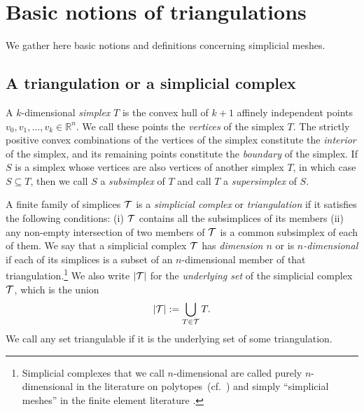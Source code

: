 \documentclass[10pt,a4paper]{article}
\newcommand\cye[1]{%
\protect\leavevmode
\begingroup
    \color{blue}%
    #1%
\endgroup
}
\begin{document}
\section{Basic notions of triangulations}\label{section:triangulations}

We gather here basic notions and definitions concerning simplicial meshes. 
  
\subsection{A triangulation or a simplicial complex}

A ${k}$-dimensional \emph{simplex} $T$ is the convex hull of ${k}+1$ affinely independent points $v_0, v_1, \ldots, v_{{k}} \in \mathbb{R}^{n}$. We call these points the \emph{vertices} of the simplex $T$. 
The strictly positive convex combinations of the vertices of the simplex constitute the \textit{ interior} of the simplex,
and its remaining points constitute the \textit{boundary} of the simplex.
If $S$ is a simplex whose vertices are also vertices of another simplex $T$, in which case $S \subseteq T$, 
then we call $S$ a \textit{subsimplex} of $T$ and call $T$ a \textit{supersimplex} of $S$. 


A finite family of simplices ${\mathcal T}$ is a \emph{simplicial complex} or \emph{triangulation} if it satisfies the following conditions: 
(i) ${\mathcal T}$ contains all the subsimplices of its members (ii) any non-empty intersection of two members of ${\mathcal T}$ is a common subsimplex of each of them. 
We say that a simplicial complex ${\mathcal T}$ has \textit{dimension $n$} or is \textit{$n$-dimensional} if each of its simplices is a subset of an $n$-dimensional member of that triangulation.\footnote{Simplicial complexes that we call $n$-dimensional are called purely $n$-dimensional in the literature on polytopes~(cf.\ \cite{ziegler1995lectures}) \cye{and simply ``simplicial meshes'' in the finite element literature}.} 
We also write $\left| {\mathcal T} \right|$ for the \textit{underlying set} of the simplicial complex ${\mathcal T}$, which is the union 
\begin{align*}
    \left| {\mathcal T} \right| := \bigcup_{ T \in {\mathcal T} } T
    .
\end{align*}
We call any set triangulable if it is the underlying set of some triangulation. 
\\
\end{document}
